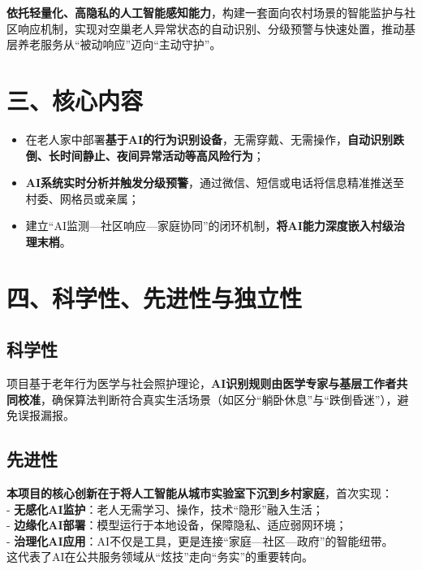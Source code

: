 \documentclass[
  letterpaper,
  DIV=11,
  numbers=noendperiod]{scrreprt}
\providecommand{\tightlist}{%
  \setlength{\itemsep}{0pt}\setlength{\parskip}{0pt}}
\begin{document}
\textbf{依托轻量化、高隐私的人工智能感知能力}，构建一套面向农村场景的智能监护与社区响应机制，实现对空巢老人异常状态的自动识别、分级预警与快速处置，推动基层养老服务从``被动响应''迈向``主动守护''。

\section{三、核心内容}\label{ux4e09ux6838ux5fc3ux5185ux5bb9}

\begin{itemize}
\tightlist
\item
  在老人家中部署\textbf{基于AI的行为识别设备}，无需穿戴、无需操作，\textbf{自动识别跌倒、长时间静止、夜间异常活动等高风险行为}；\\
\item
  \textbf{AI系统实时分析并触发分级预警}，通过微信、短信或电话将信息精准推送至村委、网格员或亲属；\\
\item
  建立``AI监测---社区响应---家庭协同''的闭环机制，\textbf{将AI能力深度嵌入村级治理末梢}。
\end{itemize}

\section{四、科学性、先进性与独立性}\label{ux56dbux79d1ux5b66ux6027ux5148ux8fdbux6027ux4e0eux72ecux7acbux6027}

\subsection{科学性}\label{ux79d1ux5b66ux6027}

项目基于老年行为医学与社会照护理论，\textbf{AI识别规则由医学专家与基层工作者共同校准}，确保算法判断符合真实生活场景（如区分``躺卧休息''与``跌倒昏迷''），避免误报漏报。

\subsection{先进性}\label{ux5148ux8fdbux6027}

\textbf{本项目的核心创新在于将人工智能从城市实验室下沉到乡村家庭}，首次实现：\\
- \textbf{无感化AI监护}：老人无需学习、操作，技术``隐形''融入生活；\\
- \textbf{边缘化AI部署}：模型运行于本地设备，保障隐私、适应弱网环境；\\
-
\textbf{治理化AI应用}：AI不仅是工具，更是连接``家庭---社区---政府''的智能纽带。\\
这代表了AI在公共服务领域从``炫技''走向``务实''的重要转向。
\end{document}
